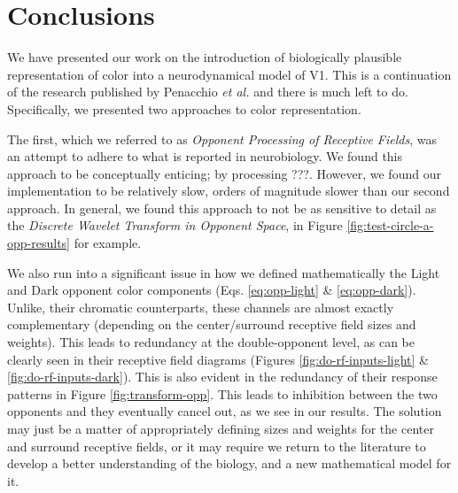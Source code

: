 \documentclass[journal,onecolumn]{IEEEtran}
\begin{document}
\section{Conclusions}

We have presented our work on the introduction of biologically plausible representation of color into a neurodynamical model of V1. This is a continuation of the research published by Penacchio \textit{et al.} \cite{penacchio:2013} and there is much left to do. Specifically, we presented two approaches to color representation.

The first, which we referred to as \textit{Opponent Processing of Receptive Fields}, was an attempt to adhere to what is reported in neurobiology. We found this approach to be conceptually enticing; by processing ???. However, we found our implementation to be relatively slow, orders of magnitude slower than our second approach. In general, we found this approach to not be as sensitive to detail as the \textit{Discrete Wavelet Transform in Opponent Space}, in Figure \ref{fig:test-circle-a-opp-results} for example.

We also run into a significant issue in how we defined mathematically the Light and Dark opponent color components (Eqs. \ref{eq:opp-light} \& \ref{eq:opp-dark}). Unlike, their chromatic counterparts, these channels are almost exactly complementary (depending on the center/surround receptive field sizes and weights). This leads to redundancy at the double-opponent level, as can be clearly seen in their receptive field diagrams (Figures \ref{fig:do-rf-inputs-light} \& \ref{fig:do-rf-inputs-dark}). This is also evident in the redundancy of their response patterns in Figure \ref{fig:transform-opp}. This leads to inhibition between the two opponents and they eventually cancel out, as we see in our results. The solution may just be a matter of appropriately defining sizes and weights for the center and surround receptive fields, or it may require we return to the literature to develop a better understanding of the biology, and a new mathematical model for it.
\end{document}
